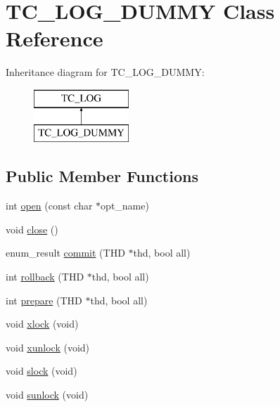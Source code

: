 \hypertarget{classTC__LOG__DUMMY}{}\section{T\+C\+\_\+\+L\+O\+G\+\_\+\+D\+U\+M\+MY Class Reference}
\label{classTC__LOG__DUMMY}
Inheritance diagram for T\+C\+\_\+\+L\+O\+G\+\_\+\+D\+U\+M\+MY\+:\begin{figure}[H]
\begin{center}
\leavevmode
\includegraphics[height=2.000000cm]{classTC__LOG__DUMMY}
\end{center}
\end{figure}
\subsection*{Public Member Functions}
\begin{DoxyCompactItemize}
\item 
int \mbox{\hyperlink{classTC__LOG__DUMMY_ac5c9f424a1544aafc9fe08e894bbce81}{open}} (const char $\ast$opt\+\_\+name)
\item 
void \mbox{\hyperlink{classTC__LOG__DUMMY_adb7792f21f5a090a7d71a646d2ebf82f}{close}} ()
\item 
enum\+\_\+result \mbox{\hyperlink{classTC__LOG__DUMMY_acb87643d4017b6946c1f1814f8a4ca36}{commit}} (T\+HD $\ast$thd, bool all)
\item 
int \mbox{\hyperlink{classTC__LOG__DUMMY_af37509e3086560c3d057a0c43b67a238}{rollback}} (T\+HD $\ast$thd, bool all)
\item 
int \mbox{\hyperlink{classTC__LOG__DUMMY_a911680c1d0a8f4e5a028e2f1920ee2a2}{prepare}} (T\+HD $\ast$thd, bool all)
\item 
void \mbox{\hyperlink{classTC__LOG__DUMMY_a48cd538ebda31693671772018d2563b9}{xlock}} (void)
\item 
void \mbox{\hyperlink{classTC__LOG__DUMMY_a0ac9df53eb4f1ec401e0bdf9d9c95f62}{xunlock}} (void)
\item 
void \mbox{\hyperlink{classTC__LOG__DUMMY_a144eb01c40fb75ae3a1c04609dc89ea3}{slock}} (void)
\item 
void \mbox{\hyperlink{classTC__LOG__DUMMY_a5ab2da6fa3688756cf9694d25db67c6c}{sunlock}} (void)
\end{DoxyCompactItemize}
